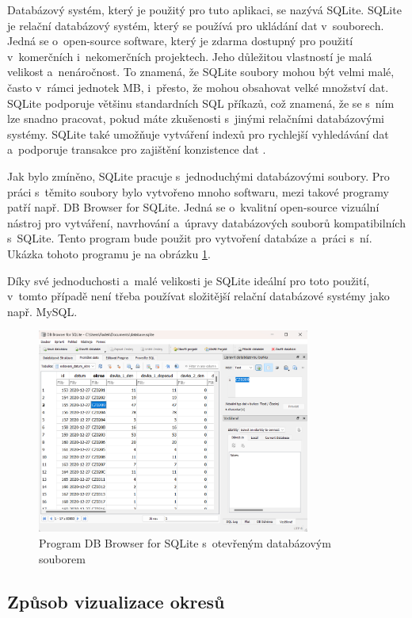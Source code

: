 Databázový systém, který je použitý pro tuto aplikaci, se nazývá SQLite. SQLite je relační databázový systém, který se používá pro ukládání dat v~souborech. Jedná se o~open-source software, který je zdarma dostupný pro použití v~komerčních i~nekomerčních projektech. Jeho důležitou vlastností je malá velikost a~nenáročnost. To znamená, že SQLite soubory mohou být velmi malé, často v~rámci jednotek MB, i~přesto, že mohou obsahovat velké množství dat. SQLite podporuje většinu standardních SQL příkazů, což znamená, že se s~ním lze snadno pracovat, pokud máte zkušenosti s~jinými relačními databázovými systémy. SQLite také umožňuje vytváření indexů pro rychlejší vyhledávání dat a~podporuje transakce pro zajištění konzistence dat \cite{what-is-sqlite}.

Jak bylo zmíněno, SQLite pracuje s~jednoduchými databázovými soubory. Pro práci s~těmito soubory bylo vytvořeno mnoho softwaru, mezi takové programy patří např. DB Browser for SQLite. Jedná se o~kvalitní open-source vizuální nástroj pro vytváření, navrhování a~úpravy databázových souborů kompatibilních s~SQLite. Tento program bude použit pro vytvoření databáze a~práci s~ní. Ukázka tohoto programu je na obrázku \ref{fig:SQliteScreenshot}.

Díky své jednoduchosti a~malé velikosti je SQLite ideální pro toto použití, v~tomto případě není třeba používat složitější relační databázové systémy jako např. MySQL.

\begin{figure}
	\centering
	\includegraphics[width=0.8\textwidth]{Pictures/screen_sqlite.png}
	\caption{Program DB Browser for SQLite s~otevřeným databázovým souborem \cite{dbbrowser}}
	\label{fig:SQliteScreenshot}
\end{figure}

\subsection{Způsob vizualizace okresů}
\label{sec:GeoJSON}

